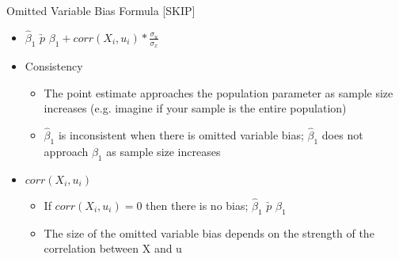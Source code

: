 \begin{frame}{Omitted Variable Bias Formula [SKIP]}
	\begin{itemize}
	\item $\hat{\beta}_{1}$   $\underrightarrow{p}$   $\beta_{1} + corr(X_{i},u_{i}) * \frac{\sigma_{u}}{\sigma_{x}} $
	\item Consistency
		\begin{itemize}
		\item The point estimate approaches the population parameter as sample size increases (e.g. imagine if your sample is the entire population)
		\item $\hat{\beta}_{1}$ is inconsistent when there is omitted variable bias; $\hat{\beta}_{1}$ does not approach $\beta_{1}$ as sample size increases
		\end{itemize}
	\item $corr(X_{i},u_{i})$
		\begin{itemize}
		\item If $corr(X_{i},u_{i}) = 0$ then there is no bias; $\hat{\beta}_{1}$   $\underrightarrow{p}$   $\beta_{1}$
		\item The size of the omitted variable bias depends on the strength of the correlation between X and u
		\end{itemize}
	\end{itemize}
\end{frame}

